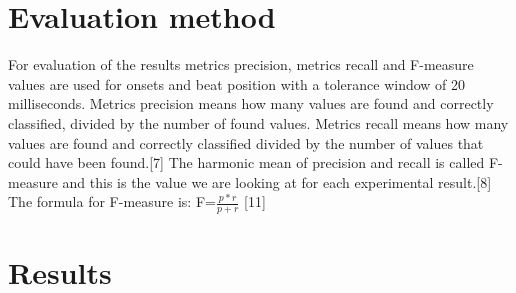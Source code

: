 \documentclass[11pt,twocolumn]{article}
\begin{document}
\section*{Evaluation method}

For evaluation of the results metrics precision, metrics recall and F-measure values are used for onsets and beat position with a tolerance window of 20 milliseconds.\newline
Metrics precision means how many values are found and correctly classified, divided by the number of found values.\newline
Metrics recall means how many values are found and correctly classified divided by the number of values that could have been found.[7]\newline
The harmonic mean of precision and recall is called F-measure and this is the value we are looking at for each experimental result.[8]\newline
The formula for F-measure is: F=$\frac{p*r}{p+r}$ [11]

\section*{Results}
\end{document}
